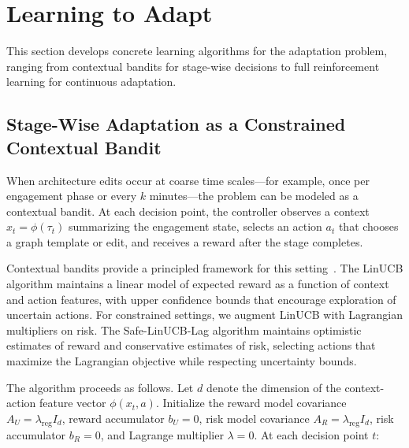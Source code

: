 \documentclass[sigconf,anonymous]{acmart}
\begin{document}
\section{Learning to Adapt}
\label{sec:learning}

This section develops concrete learning algorithms for the adaptation problem, ranging from contextual bandits for stage-wise decisions to full reinforcement learning for continuous adaptation.

\subsection{Stage-Wise Adaptation as a Constrained Contextual Bandit}

When architecture edits occur at coarse time scales---for example, once per engagement phase or every $k$ minutes---the problem can be modeled as a contextual bandit. At each decision point, the controller observes a context $x_t = \phi(\tau_t)$ summarizing the engagement state, selects an action $a_t$ that chooses a graph template or edit, and receives a reward after the stage completes.

Contextual bandits provide a principled framework for this setting~\cite{li2010contextualbandit,chu2011contextual}. The LinUCB algorithm maintains a linear model of expected reward as a function of context and action features, with upper confidence bounds that encourage exploration of uncertain actions. For constrained settings, we augment LinUCB with Lagrangian multipliers on risk. The Safe-LinUCB-Lag algorithm maintains optimistic estimates of reward and conservative estimates of risk, selecting actions that maximize the Lagrangian objective while respecting uncertainty bounds.

The algorithm proceeds as follows. Let $d$ denote the dimension of the context-action feature vector $\phi(x_t, a)$. Initialize the reward model covariance $A_U = \lambda_{\text{reg}} I_d$, reward accumulator $b_U = 0$, risk model covariance $A_R = \lambda_{\text{reg}} I_d$, risk accumulator $b_R = 0$, and Lagrange multiplier $\lambda = 0$. At each decision point $t$:
\end{document}
